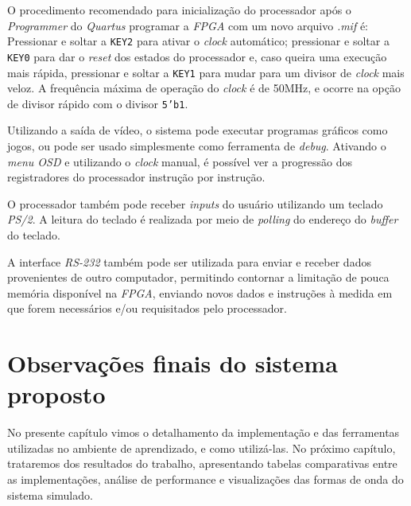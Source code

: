     { O procedimento recomendado para inicialização do processador após o
        \textit{Programmer} do \textit{Quartus} programar a \textit{FPGA} com
        um novo arquivo \textit{.mif} é: Pressionar e soltar a \texttt{KEY2}
        para ativar o \textit{clock} automático; pressionar e soltar a
        \texttt{KEY0} para dar o \textit{reset} dos estados do processador e,
        caso queira uma execução mais rápida, pressionar e soltar a \texttt{KEY1}
        para mudar para um divisor de \textit{clock} mais veloz. A frequência
        máxima de operação do \textit{clock} é de 50MHz, e ocorre na opção de
        divisor rápido com o divisor \texttt{5'b1}.
    }

    { Utilizando a saída de vídeo, o sistema pode executar programas gráficos
        como jogos, ou pode ser usado simplesmente como ferramenta de \textit{debug}.
        Ativando o \textit{menu OSD} e utilizando o \textit{clock} manual, é
        possível ver a progressão dos registradores do processador instrução por
        instrução.
    }

    { O processador também pode receber \textit{inputs} do usuário utilizando
        um teclado \textit{PS/2}. A leitura do teclado é realizada por meio de
        \textit{polling} do endereço do \textit{buffer} do teclado.
    }

    { A interface \textit{RS-232} também pode ser utilizada para enviar e receber
        dados provenientes de outro computador, permitindo contornar a limitação
        de pouca memória disponível na \textit{FPGA}, enviando novos dados e
        instruções à medida em que forem necessários e/ou requisitados pelo
        processador.
    }


\section{Observações finais do sistema proposto}
    { No presente capítulo vimos o detalhamento da implementação e das ferramentas
        utilizadas no ambiente de aprendizado, e como utilizá-las. No próximo
        capítulo, trataremos dos resultados do trabalho, apresentando tabelas
        comparativas entre as implementações, análise de performance e visualizações
        das formas de onda do sistema simulado.
    }

